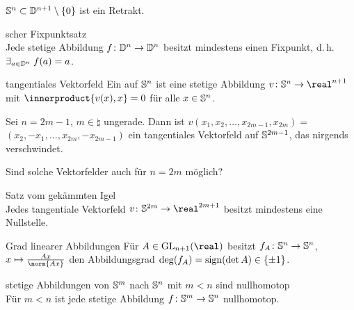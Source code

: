 \begin{Bem}
    $\mathbb{S}^n \subset \mathbb{D}^{n+1} \setminus \{0\}$ ist ein Retrakt.
\end{Bem}

\begin{Satz}{scher Fixpunktsatz}\\
    Jede stetige Abbildung $f\colon \mathbb{D}^n \rightarrow \mathbb{D}^n$
    besitzt mindestens einen Fixpunkt, d.\,h.
    $\exists_{a \in \mathbb{D}^n}\; f(a) = a$.
\end{Satz}

\linie

\begin{Def}{tangentiales Vektorfeld}
    Ein  auf $\mathbb{S}^n$ ist eine
    stetige Abbildung $v\colon \sphere^n \rightarrow \real^{n+1}$
    mit $\innerproduct{v(x), x} = 0$ für alle $x \in \mathbb{S}^n$.
\end{Def}

\begin{Bsp}
    Sei $n = 2m - 1$, $m \in \natural$ ungerade.
    Dann ist $v(x_1, x_2, \dots, x_{2m-1}, x_{2m}) =$ \\
    $(x_2, -x_1, \dotsc, x_{2m}, -x_{2m-1})$ ein tangentiales Vektorfeld auf
    $\mathbb{S}^{2m-1}$, das nirgends verschwindet.
\end{Bsp}

\begin{Bem}
    Sind solche Vektorfelder auch für $n = 2m$ möglich?
\end{Bem}

\begin{Satz}{Satz vom gekämmten Igel}\\
    Jedes tangentiale Vektorfeld
    $v\colon \sphere^{2m} \rightarrow \real^{2m+1}$
    besitzt mindestens eine Nullstelle.
\end{Satz}

\begin{Lemma}{Grad linearer Abbildungen}
    Für $A \in \GL_{n+1}(\real)$ besitzt
    $f_A\colon \mathbb{S}^n \rightarrow \mathbb{S}^n$,
    $x \mapsto \frac{Ax}{\norm{Ax}}$ den Abbildungsgrad
    $\deg(f_A) = \operatorname{sign}(\det A) \in \{\pm 1\}$.
\end{Lemma}

\linie

\begin{Satz}{stetige Abbildungen von $\mathbb{S}^m$ nach
             $\mathbb{S}^n$ mit $m < n$ sind nullhomotop}\\
    Für $m < n$ ist jede stetige Abbildung
    $f\colon \mathbb{S}^m \rightarrow \mathbb{S}^n$ nullhomotop.
\end{Satz}

